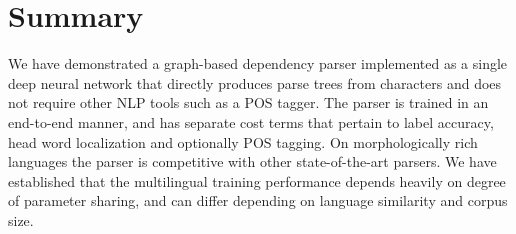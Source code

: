 \chapter{Summary}
We have demonstrated a graph-based dependency parser implemented as a single deep
neural network that directly produces parse trees from characters and does not require
other NLP tools such as a POS tagger. The parser is trained in an end-to-end manner,
and has separate cost terms that pertain to label accuracy,
head word localization and optionally POS tagging. On
morphologically rich languages the parser is competitive
with other state-of-the-art parsers.
We have established that the multilingual training performance depends heavily
on degree of parameter sharing, and can differ depending on language similarity
and corpus size.

